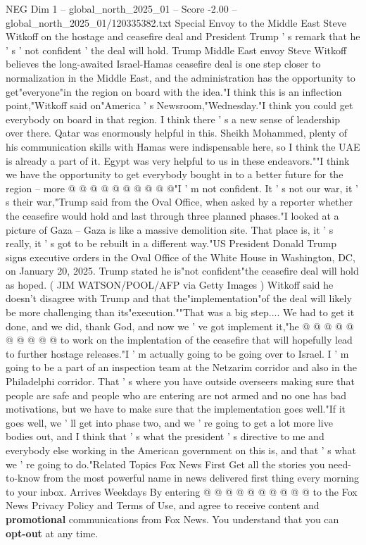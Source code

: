 \begin{textsample}{NEG Dim 1 – global\_north\_2025\_01 – Score -2.00 – global\_north\_2025\_01/120335382.txt}  \label{ex:f1_neg_079}
Special Envoy to the Middle East Steve Witkoff on the hostage and ceasefire deal and President Trump ' s remark that he ' s ' not confident ' the deal will hold.
Trump Middle East envoy Steve Witkoff believes the long-awaited Israel-Hamas ceasefire deal is one step closer to normalization in the Middle East, and the administration has the opportunity to get"everyone"in the region on board with the idea."I think this is an inflection point,"Witkoff said on"America ' s Newsroom,"Wednesday."I think you could get everybody on board in that region.
I think there ' s a new sense of leadership over there.
Qatar was enormously helpful in this.
Sheikh Mohammed, plenty of his communication skills with Hamas were indispensable here, so I think the UAE is already a part of it.
Egypt was very helpful to us in these endeavors.""I think we have the opportunity to get everybody bought in to a better future for the region -- more @ @ @ @ @ @ @ @ @ @"I ' m not confident.
It ' s not our war, it ' s their war,"Trump said from the Oval Office, when asked by a reporter whether the ceasefire would hold and last through three planned phases."I looked at a picture of Gaza -- Gaza is like a massive demolition site.
That place is, it ' s really, it ' s got to be rebuilt in a different way."US President Donald Trump signs executive orders in the Oval Office of the White House in Washington, DC, on January 20, 2025.
Trump stated he is"not confident"the ceasefire deal will hold as hoped. ( JIM WATSON/POOL/AFP via Getty Images ) Witkoff said he doesn't disagree with Trump and that the"implementation"of the deal will likely be more challenging than its"execution.""That was a big step....
We had to get it done, and we did, thank God, and now we ' ve got implement it,"he @ @ @ @ @ @ @ @ @ @ to work on the implentation of the ceasefire that will hopefully lead to further hostage releases."I ' m actually going to be going over to Israel.
I ' m going to be a part of an inspection team at the Netzarim corridor and also in the Philadelphi corridor.
That ' s where you have outside overseers making sure that people are safe and people who are entering are not armed and no one has bad motivations, but we have to make sure that the implementation goes well."If it goes well, we ' ll get into phase two, and we ' re going to get a lot more live bodies out, and I think that ' s what the president ' s directive to me and everybody else working in the American government on this is, and that ' s what we ' re going to do."Related Topics Fox News First Get all the stories you need-to-know from the most powerful name in news delivered first thing every morning to your inbox.
Arrives Weekdays By entering @ @ @ @ @ @ @ @ @ @ to the Fox News Privacy Policy and Terms of Use, and agree to receive content and \textbf{promotional} communications from Fox News.
You understand that you can \textbf{opt-out} at any time.

\end{textsample}
